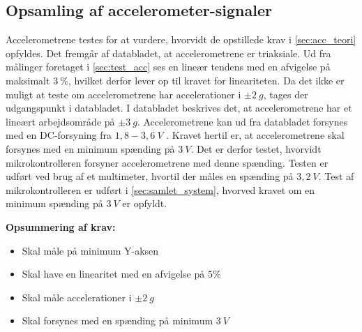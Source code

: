 \subsection{Opsamling af accelerometer-signaler}

Accelerometrene testes for at vurdere, hvorvidt de opstillede krav i \autoref{sec:acc_teori} opfyldes. 
Det fremgår af databladet, at accelerometrene er triaksiale.  
Ud fra målinger foretaget i \autoref{sec:test_acc} ses en lineær tendens med en afvigelse på maksimalt $3~\%$, hvilket derfor lever op til kravet for lineariteten. Da det ikke er muligt at teste om accelerometrene har accelerationer i $\pm2~g$, tages der udgangspunkt i databladet. I databladet beskrives det, at accelerometrene har et lineært arbejdsområde på $\pm 3~g$.
Accelerometrene kan ud fra databladet forsynes med en DC-forsyning fra $1,8-3,6~V$ \citep{analogdevices2009}. Kravet hertil er, at accelerometrene skal forsynes med en minimum spænding på $3~V$. Det er derfor testet, hvorvidt mikrokontrolleren forsyner accelerometrene med denne spænding. Testen er udført ved brug af et multimeter, hvortil der måles en spænding på $3,2~V$. Test af mikrokontrolleren er udført i \autoref{sec:samlet_system}, hvorved kravet om en minimum spænding på $3~V$ er opfyldt.

\vspace{3mm}
\textbf{Opsummering af krav:}
\begin{itemize}
\item[\text{\sffamily \checkmark}] Skal måle på minimum Y-aksen
\item[\text{\sffamily \checkmark}] Skal have en linearitet med en afvigelse på $5\%$
\item[\text{\sffamily \checkmark}] Skal måle accelerationer i $\pm2~g$
\item[\text{\sffamily \checkmark}] Skal forsynes med en spænding på minimum $3~V$
\end{itemize}

